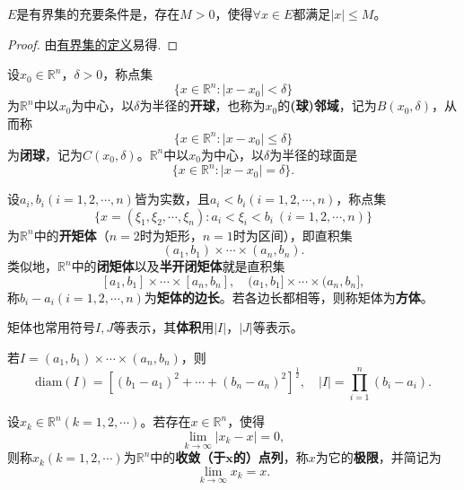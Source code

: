 \documentclass[lang=cn,newtx,10pt,scheme=chinese]{../Template/elegantbook}
\begin{document}
\begin{proposition}[有界集的充要条件]\label{proposition:有界集的充要条件}
  \(E\)是有界集的充要条件是，存在\(M > 0\)，使得\(\forall x\in E\)都满足\(|x|\leqslant M\)。
\end{proposition}
\begin{proof}
  由\hyperref[definition:点集的直径与有界集]{有界集的定义}易得.

\end{proof}

\begin{definition}[点的(球)邻域]\label{definition:点的(球)邻域}
  设\(x_0\in\mathbb{R}^n\)，\(\delta>0\)，称点集
\[\{x\in\mathbb{R}^n:|x - x_0|<\delta\}\]
为\(\mathbb{R}^n\)中以\(x_0\)为中心，以\(\delta\)为半径的\textbf{开球}，也称为\(x_0\)的\textbf{(球)邻域}，记为\(B(x_0,\delta)\)，从而称
\[\{x\in\mathbb{R}^n:|x - x_0|\leqslant\delta\}\]
为\textbf{闭球}，记为\(C(x_0,\delta)\)。\(\mathbb{R}^n\)中以\(x_0\)为中心，以\(\delta\)为半径的球面是
\[\{x\in\mathbb{R}^n:|x - x_0|=\delta\}.\]
\end{definition}

\begin{definition}[矩体]
设\(a_i,b_i(i = 1,2,\cdots,n)\)皆为实数，且\(a_i < b_i(i = 1,2,\cdots,n)\)，称点集
\[\{x = (\xi_1,\xi_2,\cdots,\xi_n):a_i<\xi_i < b_i\ (i = 1,2,\cdots,n)\}\]
为\(\mathbb{R}^n\)中的\textbf{开矩体}（\(n = 2\)时为矩形，\(n = 1\)时为区间），即直积集
\[(a_1,b_1)\times\cdots\times(a_n,b_n).\]
类似地，\(\mathbb{R}^n\)中的\textbf{闭矩体}以及\textbf{半开闭矩体}就是直积集
\[[a_1,b_1]\times\cdots\times[a_n,b_n],\quad(a_1,b_1]\times\cdots\times(a_n,b_n],\]
称\(b_i - a_i(i = 1,2,\cdots,n)\)为\textbf{矩体的边长}。若各边长都相等，则称矩体为\textbf{方体}。

矩体也常用符号\(I,J\)等表示，其\textbf{体积}用\(|I|\)，\(|J|\)等表示。
\end{definition}

\begin{proposition}[矩体的直径与体积]\label{proposition:矩体的直径与体积}
  若\(I=(a_1,b_1)\times\cdots\times(a_n,b_n)\)，则
\[\text{diam}(I)=[(b_1 - a_1)^2+\cdots+(b_n - a_n)^2]^{\frac{1}{2}},\quad |I|=\prod_{i = 1}^{n}(b_i - a_i).\]
\end{proposition}

\begin{definition}
  设\(x_k\in\mathbb{R}^n(k = 1,2,\cdots)\)。若存在\(x\in\mathbb{R}^n\)，使得
\[\lim_{k\rightarrow\infty}|x_k - x| = 0,\]
则称\(x_k(k = 1,2,\cdots)\)为\(\mathbb{R}^n\)中的\textbf{收敛（于\(\boldsymbol{x}\)的）点列}，称\(x\)为它的\textbf{极限}，并简记为
\[\lim_{k\rightarrow\infty}x_k = x.\]
\end{definition}
\end{document}
